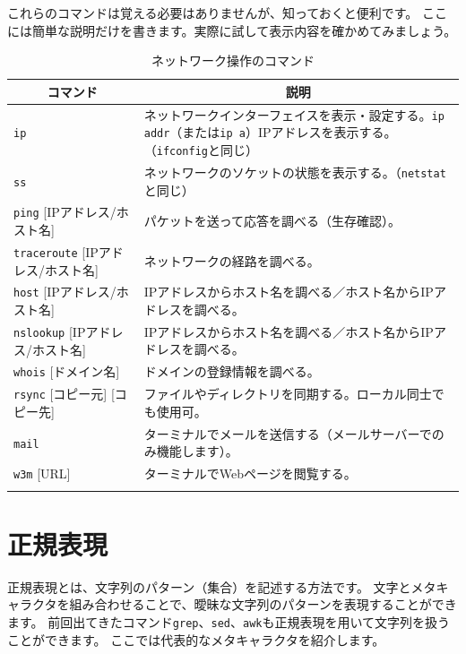 \documentclass[a4j]{ltjsreport}
\begin{document}
    \newpage
    これらのコマンドは覚える必要はありませんが、知っておくと便利です。
    ここには簡単な説明だけを書きます。実際に試して表示内容を確かめてみましょう。
    \begin{longtable}[c]{|p{3.5cm}|p{13.5cm}|}
        \hline
        \multicolumn{1}{|c|}{\textbf{コマンド}}&\multicolumn{1}{|c|}{\textbf{説明}}\\
        \hline\hline
        \texttt{ip}&ネットワークインターフェイスを表示・設定する。\texttt{ip addr}（または\texttt{ip a}）IPアドレスを表示する。（\texttt{ifconfig}と同じ）\\
        \hline
        \texttt{ss}&ネットワークのソケットの状態を表示する。（\texttt{netstat}と同じ）\\
        \hline
        \texttt{ping} [IPアドレス/ホスト名] &パケットを送って応答を調べる（生存確認）。\\
        \hline
        \texttt{traceroute} [IPアドレス/ホスト名] &ネットワークの経路を調べる。\\
        \hline
        \texttt{host} [IPアドレス/ホスト名] &IPアドレスからホスト名を調べる／ホスト名からIPアドレスを調べる。\\
        \hline
        \texttt{nslookup} [IPアドレス/ホスト名] &IPアドレスからホスト名を調べる／ホスト名からIPアドレスを調べる。\\
        \hline
        \texttt{whois} [ドメイン名] &ドメインの登録情報を調べる。\\
        \hline
        \texttt{rsync} [コピー元] [コピー先] &ファイルやディレクトリを同期する。ローカル同士でも使用可。\\
        \hline
        \texttt{mail} & ターミナルでメールを送信する（メールサーバーでのみ機能します）。\\
        \hline
        \texttt{w3m} [URL] &ターミナルでWebページを閲覧する。\\
        \hline
        \caption{ネットワーク操作のコマンド}
    \end{longtable}
    


    \section{正規表現}
    正規表現とは、文字列のパターン（集合）を記述する方法です。
    文字とメタキャラクタを組み合わせることで、曖昧な文字列のパターンを表現することができます。
    前回出てきたコマンド\texttt{grep}、\texttt{sed}、\texttt{awk}も正規表現を用いて文字列を扱うことができます。
    ここでは代表的なメタキャラクタを紹介します。
\end{document}
